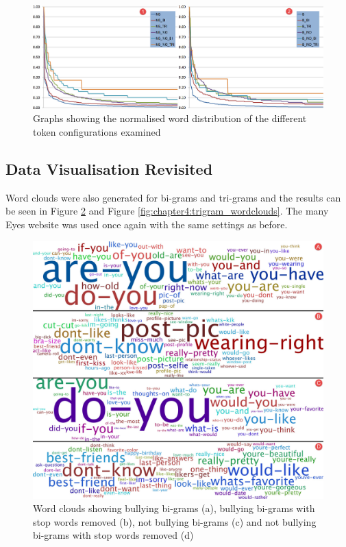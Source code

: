 \begin{figure}[!htb]
	\centering
	\includegraphics[width=1.0\textwidth]{Figures/Chapter4/word_frequencies_clean.jpg}
	\caption[Normalised distribution of word frequencies]{Graphs showing the normalised word distribution of the different token configurations examined}
	\label{fig:chapter4:word_frequencies_clean}
\end{figure}

\subsection{Data Visualisation Revisited}

Word clouds were also generated for bi-grams and tri-grams and the results can be seen in Figure \ref{fig:chapter4:bi-grams_wordclouds} and Figure \ref{fig:chapter4:trigram_wordclouds}. The many Eyes website was used once again with the same settings as before.

\begin{figure}[!htb]
	\centering
	\includegraphics[width=1.0\textwidth]{Figures/Chapter4/bigram_clouds.jpg}
	\caption[Bi-gram word clouds]{Word clouds showing bullying bi-grams (a), bullying bi-grams with stop words removed (b), not bullying bi-grams (c) and not bullying bi-grams with stop words removed (d)}
	\label{fig:chapter4:bi-grams_wordclouds}
\end{figure}


